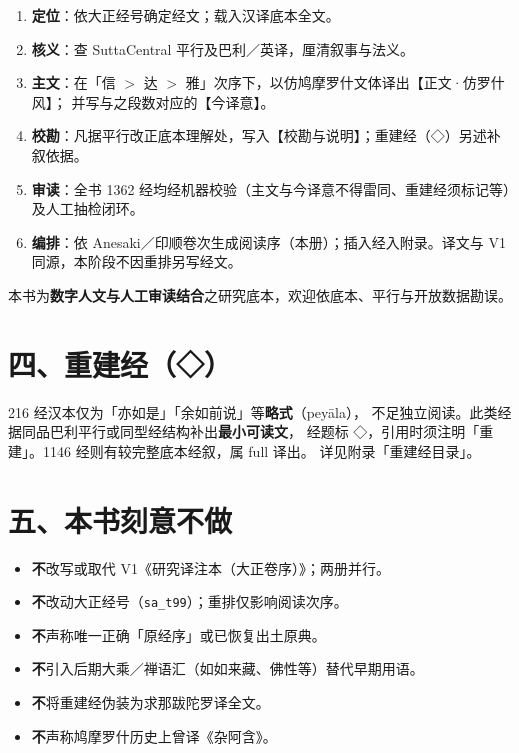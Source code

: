 \begin{enumerate}[label=\textbf{\arabic*.}]
  \item \textbf{定位}：依大正经号确定经文；载入汉译底本全文。
  \item \textbf{核义}：查 SuttaCentral 平行及巴利／英译，厘清叙事与法义。
  \item \textbf{主文}：在「信 $>$ 达 $>$ 雅」次序下，以仿鸠摩罗什文体译出【正文·仿罗什风】；
  并写与之段数对应的【今译意】。
  \item \textbf{校勘}：凡据平行改正底本理解处，写入【校勘与说明】；重建经（◇）另述补叙依据。
  \item \textbf{审读}：全书 1362 经均经机器校验（主文与今译意不得雷同、重建经须标记等）及人工抽检闭环。
  \item \textbf{编排}：依 Anesaki／印顺卷次生成阅读序（本册）；插入经入附录。译文与 V1 同源，本阶段不因重排另写经文。
\end{enumerate}

\noindent 本书为\textbf{数字人文与人工审读结合}之研究底本，欢迎依底本、平行与开放数据勘误。

\section*{四、重建经（◇）}

216 经汉本仅为「亦如是」「余如前说」等\textbf{略式}（peyāla），
不足独立阅读。此类经据同品巴利平行或同型经结构补出\textbf{最小可读文}，
经题标 ◇，引用时须注明「重建」。1146 经则有较完整底本经叙，属 full 译出。
详见附录「重建经目录」。

\section*{五、本书刻意不做}

\begin{itemize}
  \item \textbf{不}改写或取代 V1《研究译注本（大正卷序）》；两册并行。
  \item \textbf{不}改动大正经号（\texttt{sa\_t99}）；重排仅影响阅读次序。
  \item \textbf{不}声称唯一正确「原经序」或已恢复出土原典。
  \item \textbf{不}引入后期大乘／禅语汇（如如来藏、佛性等）替代早期用语。
  \item \textbf{不}将重建经伪装为求那跋陀罗译全文。
  \item \textbf{不}声称鸠摩罗什历史上曾译《杂阿含》。
\end{itemize}

